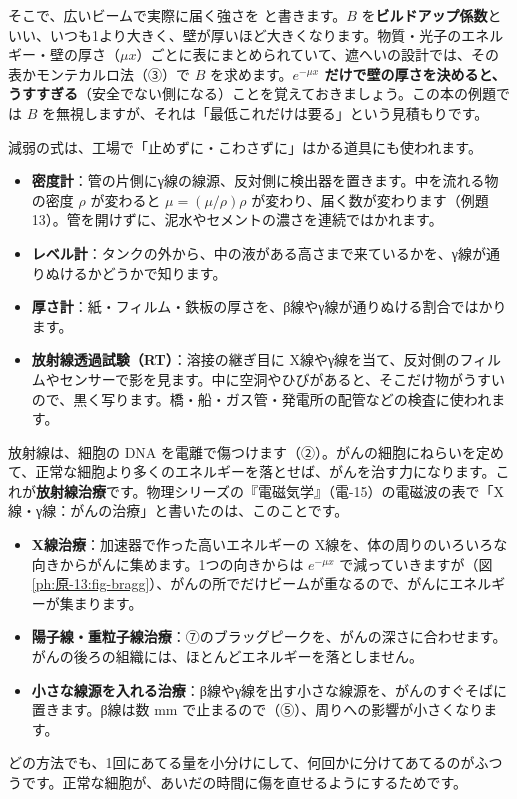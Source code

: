 そこで、広いビームで実際に届く強さを
と書きます。$B$ を\textbf{ビルドアップ係数}といい、いつも1より大きく、壁が厚いほど大きくなります。物質・光子のエネルギー・壁の厚さ（$\mu x$）ごとに表にまとめられていて、遮へいの設計では、その表かモンテカルロ法（③）で $B$ を求めます。\textbf{$e^{-\mu x}$ だけで壁の厚さを決めると、うすすぎる}（安全でない側になる）ことを覚えておきましょう。この本の例題では $B$ を無視しますが、それは「最低これだけは要る」という見積もりです。

\label{ph:原-13:sec11}
減弱の式は、工場で「止めずに・こわさずに」はかる道具にも使われます。
\begin{itemize}[label={\color{bkTheme}●}, leftmargin=1.6\zw, itemsep=1pt, topsep=1pt]
\item \textbf{密度計}：管の片側にγ線の線源、反対側に検出器を置きます。中を流れる物の密度 $\rho$ が変わると $\mu=(\mu/\rho)\rho$ が変わり、届く数が変わります（例題13）。管を開けずに、泥水やセメントの濃さを連続ではかれます。
\item \textbf{レベル計}：タンクの外から、中の液がある高さまで来ているかを、γ線が通りぬけるかどうかで知ります。
\item \textbf{厚さ計}：紙・フィルム・鉄板の厚さを、β線やγ線が通りぬける割合ではかります。
\item \textbf{放射線透過試験（RT）}：溶接の継ぎ目に X線やγ線を当て、反対側のフィルムやセンサーで影を見ます。中に空洞やひびがあると、そこだけ物がうすいので、黒く写ります。橋・船・ガス管・発電所の配管などの検査に使われます。
\end{itemize}

\label{ph:原-13:sec12}
放射線は、細胞の DNA を電離で傷つけます（②）。がんの細胞にねらいを定めて、正常な細胞より多くのエネルギーを落とせば、がんを治す力になります。これが\textbf{放射線治療}です。物理シリーズの『電磁気学』（電-15）の電磁波の表で「X線・γ線：がんの治療」と書いたのは、このことです。
\begin{itemize}[label={\color{bkTheme}●}, leftmargin=1.6\zw, itemsep=1pt, topsep=1pt]
\item \textbf{X線治療}：加速器で作った高いエネルギーの X線を、体の周りのいろいろな向きからがんに集めます。1つの向きからは $e^{-\mu x}$ で減っていきますが（図\ref{ph:原-13:fig-bragg}）、がんの所でだけビームが重なるので、がんにエネルギーが集まります。
\item \textbf{陽子線・重粒子線治療}：⑦のブラッグピークを、がんの深さに合わせます。がんの後ろの組織には、ほとんどエネルギーを落としません。
\item \textbf{小さな線源を入れる治療}：β線やγ線を出す小さな線源を、がんのすぐそばに置きます。β線は数 mm で止まるので（⑤）、周りへの影響が小さくなります。
\end{itemize}
どの方法でも、1回にあてる量を小分けにして、何回かに分けてあてるのがふつうです。正常な細胞が、あいだの時間に傷を直せるようにするためです。

